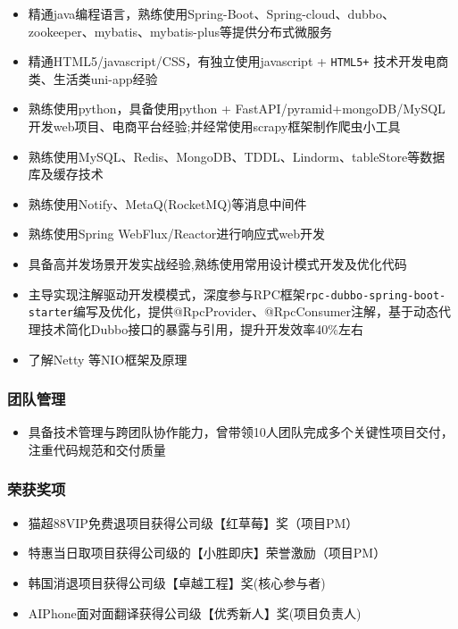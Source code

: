 \begin{itemize}
\tightlist
\item
  精通java编程语言，熟练使用Spring-Boot、Spring-cloud、dubbo、zookeeper、mybatis、mybatis-plus等提供分布式微服务
\item
  精通HTML5/javascript/CSS，有独立使用javascript + \texttt{HTML5+}
  技术开发电商类、生活类uni-app经验
\item
  熟练使用python，具备使用python +
  FastAPI/pyramid+mongoDB/MySQL开发web项目、电商平台经验;并经常使用scrapy框架制作爬虫小工具
\item
  熟练使用MySQL、Redis、MongoDB、TDDL、Lindorm、tableStore等数据库及缓存技术
\item
  熟练使用Notify、MetaQ(RocketMQ)等消息中间件
\item
  熟练使用Spring WebFlux/Reactor进行响应式web开发
\item
  具备高并发场景开发实战经验,熟练使用常用设计模式开发及优化代码
\item
  主导实现注解驱动开发模模式，深度参与RPC框架\texttt{rpc-dubbo-spring-boot-starter}编写及优化，提供@RpcProvider、@RpcConsumer注解，基于动态代理技术简化Dubbo接口的暴露与引用，提升开发效率40\%左右
\item
  了解Netty 等NIO框架及原理
\end{itemize}

\subsubsection{团队管理}\label{ux56e2ux961fux7ba1ux7406}

\begin{itemize}
\tightlist
\item
  具备技术管理与跨团队协作能力，曾带领10人团队完成多个关键性项目交付，注重代码规范和交付质量
\end{itemize}

\subsubsection{荣获奖项}\label{ux8363ux83b7ux5956ux9879}

\begin{itemize}
\tightlist
\item
  猫超88VIP免费退项目获得公司级【红草莓】奖（项目PM）
\item
  特惠当日取项目获得公司级的【小胜即庆】荣誉激励（项目PM）
\item
  韩国消退项目获得公司级【卓越工程】奖(核心参与者)
\item
  AIPhone面对面翻译获得公司级【优秀新人】奖(项目负责人)
\end{itemize}

